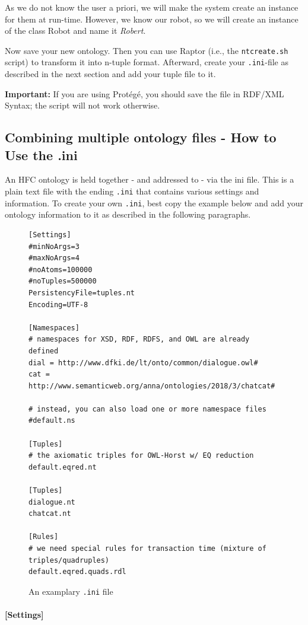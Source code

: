 \documentclass[a4paper]{report}
\begin{document}
As we do not know the user a priori, we will make the system create an instance
for them at run-time. However, we know our robot, so we will create an instance
of the class Robot and name it \textit{Robert}.

Now save your new ontology. Then you can use Raptor (i.e., the
\texttt{ntcreate.sh} script) to transform it into n-tuple format. Afterward,
create your \texttt{.ini}-file as described in the next section and add your
tuple file to it.

\textbf{Important:} If you are using Prot\'eg\'e, you should save the file in
RDF/XML Syntax; the script will not work otherwise.


\subsection{Combining multiple ontology files - How to Use the .ini}

An HFC ontology is held together - and addressed to - via the ini file. This is
a plain text file with the ending \texttt{.ini} that contains various settings
and information. To create your own \texttt{.ini}, best copy the example below
and add your ontology information to it as described in the following
paragraphs.

\begin{figure} [htbp]
\begin{verbatim}
[Settings]
#minNoArgs=3
#maxNoArgs=4
#noAtoms=100000
#noTuples=500000
PersistencyFile=tuples.nt
Encoding=UTF-8

[Namespaces]
# namespaces for XSD, RDF, RDFS, and OWL are already defined
dial = http://www.dfki.de/lt/onto/common/dialogue.owl#
cat = http://www.semanticweb.org/anna/ontologies/2018/3/chatcat#

# instead, you can also load one or more namespace files
#default.ns

[Tuples]
# the axiomatic triples for OWL-Horst w/ EQ reduction
default.eqred.nt

[Tuples]
dialogue.nt
chatcat.nt

[Rules]
# we need special rules for transaction time (mixture of triples/quadruples)
default.eqred.quads.rdl
\end{verbatim}
\caption{An examplary \texttt{.ini} file}
\label{fig:ini}
\end{figure}

\paragraph{[Settings]}
\end{document}

